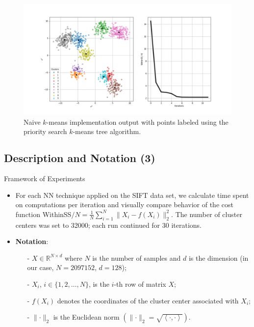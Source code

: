 \begin{frame}
	
	\begin{figure}
		\centering
		\includegraphics[width=0.95\linewidth]{../images/flann/kmeans_test}
		\caption{\scriptsize Naive $k$-means implementation output with points labeled using the priority search $k$-means tree algorithm.}
		\label{fig:km_example}
	\end{figure}
	
\end{frame}

\subsection{Description and Notation (3)}

\begin{frame}
	
	
	\begin{block}{Framework of Experiments}
		
		\begin{itemize}
			
			\item 	For each NN technique applied on the SIFT data set, we calculate time spent on computations per iteration and visually compare behavior of the cost function WithinSS$/ N = \frac{1}{N}\sum_{i = 1}^{N} \lVert X_{i} - f(X_{i})\rVert_{2}^{2}$. The number of cluster centers was set to 32000; each run continued for 30 iterations.
			
			\item \textbf{Notation}:
			
			\begin{itemize}
				\item[-] $X \in \mathbb{R}^{N \times d}$ where $N$ is the number of samples and $d$ is the dimension (in our case, $N = 2097152$, $d = 128$);
				\item[-] $X_{i}$, $i \in \{1, 2, \dots, N\}$, is the $i$-th row of matrix $X$;
				\item[-] $f(X_{i})$ denotes the coordinates of the cluster center associated with $X_{i}$;
				\item[-] $\lVert \cdot \rVert_{2}$ is the Euclidean norm $\left( \lVert \cdot \rVert_{2} = \sqrt{\left< \cdot, \cdot \right>} \right)$.
			\end{itemize}	
		\end{itemize}
		
	\end{block}
	
\end{frame}


